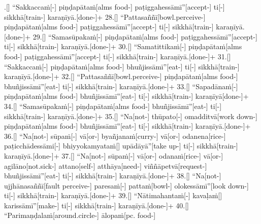 \documentclass[12pt]{article}
\begin{document}
\begin{paracol}{2}
\begin{column}
\begin{flushleft}
.[] “Sakkaccaṁ[-\NUL{\GMU{}}] piṇḍapātaṁ[alms food-] paṭiggahessāmī”[accept-] ti[-\NUL{\GMU{}}] sikkhā[train-] karaṇīyā.[done-]+ 28.[] “Pattasaññī[bowl.perceive-] piṇḍapātaṁ[alms food-] paṭiggahessāmī”[accept-] ti[-\NUL{\GMU{}}] sikkhā[train-] karaṇīyā.[done-]+ 29.[] “Samasūpakaṁ[-\NUL{\GMU{}}] piṇḍapātaṁ[alms food-] paṭiggahessāmī”[accept-] ti[-\NUL{\GMU{}}] sikkhā[train-] karaṇīyā.[done-]+ 30.[] “Samatittikaṁ[-\NUL{\GMU{}}] piṇḍapātaṁ[alms food-] paṭiggahessāmī”[accept-] ti[-\NUL{\GMU{}}] sikkhā[train-] karaṇīyā.[done-]+ 31.[] “Sakkaccaṁ[-\NUL{\GMU{}}] piṇḍapātaṁ[alms food-] bhuñjissāmī”[eat-] ti[-\NUL{\GMU{}}] sikkhā[train-] karaṇīyā.[done-]+ 32.[] “Pattasaññī[bowl.perceive-] piṇḍapātaṁ[alms food-] bhuñjissāmī”[eat-] ti[-\NUL{\GMU{}}] sikkhā[train-] karaṇīyā.[done-]+ 33.[] “Sapadānaṁ[-\NUL{\GMU{}}] piṇḍapātaṁ[alms food-] bhuñjissāmī”[eat-] ti[-\NUL{\GMU{}}] sikkhā[train-] karaṇīyā[done-]+ 34.[] “Samasūpakaṁ[-\NUL{\GMU{}}] piṇḍapātaṁ[alms food-] bhuñjissāmī”[eat-] ti[-\NUL{\GMU{}}] sikkhā[train-] karaṇīyā.[done-]+ 35.[] “Na[not-] thūpato[-\NUL{\GMU{}}] omadditvā[work down-] piṇḍapātaṁ[alms food-] bhuñjissāmī”[eat-] ti[-\NUL{\GMU{}}] sikkhā[train-] karaṇīyā.[done-]+ 36.[] “Na[not-] sūpaṁ[-\NUL{\GMU{}}] vā[or-] byañjanaṁ[curry-] vā[or-] odanena[rice-] paṭicchādessāmi[-\NUL{\GMU{}}] bhiyyokamyataṁ[] upādāyā”[take up-\NUL{\GMU{}}] ti[-\NUL{\GMU{}}] sikkhā[train-] karaṇīyā.[done-]+ 37.[] “Na[not-] sūpaṁ[-\NUL{\GMU{}}] vā[or-] odanaṁ[rice-] vā[or-] agilāno[not.sick-] attano[self-] atthāya[need-] viññāpetvā[request-] bhuñjissāmī”[eat-] ti[-\NUL{\GMU{}}] sikkhā[train-] karaṇīyā.[done-]+ 38.[] “Na[not-] ujjhānasaññī[fault perceive-] paresaṁ[-\NUL{\GMU{}}] pattaṁ[bowl-] olokessāmī”[look down-] ti[-\NUL{\GMU{}}] sikkhā[train-] karaṇīyā.[done-]+ 39.[] “Nātimahantaṁ[-\NUL{\GMU{}}] kavaḷaṁ[] karissāmī”[make-] ti[-\NUL{\GMU{}}] sikkhā[train-] karaṇīyā.[done-]+ 40.[] “Parimaṇḍalaṁ[around.circle-] ālopaṁ[pc. food-] 
\end{flushleft}
\end{column}
\end{paracol}
\end{document}
